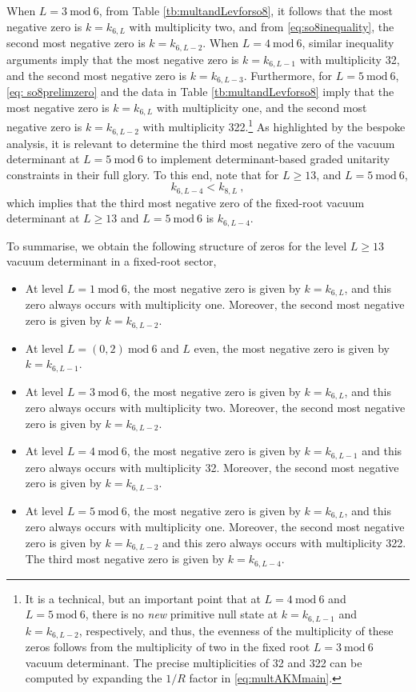 When $L = 3~\textrm{mod}~6$, from Table \ref{tb:multandLevforso8}, it follows that the most negative zero is $k = k_{6,L}$ with multiplicity two, and from \eqref{eq:so8inequality}, the second most negative zero is $k = k_{6,L-2}$. When $L = 4~\textrm{mod}~6$, similar inequality arguments imply that the most negative zero is $k = k_{6,L-1}$ with multiplicity 32, and the second most negative zero is $k = k_{6,L-3}$. Furthermore, for $L = 5~\textrm{mod}~6$, \eqref{eq: so8prelimzero} and the data in Table \ref{tb:multandLevforso8} imply that the most negative zero is $k = k_{6,L}$ with multiplicity one, and the second most negative zero is $k = k_{6,L-2}$ with multiplicity 322.\footnote{It is a technical, but an important point that at $L = 4~\textrm{mod}~6$ and $L = 5~\textrm{mod}~6$, there is no \emph{new} primitive null state at $k = k_{6,L-1}$ and $k = k_{6,L-2}$, respectively, and thus, the evenness of the multiplicity of these zeros follows from the multiplicity of two in the fixed root $L = 3~\textrm{mod}~6$ vacuum determinant. The precise multiplicities of 32 and 322 can be computed by expanding the $1/R$ factor in \eqref{eq:multAKMmain}.} As highlighted by the bespoke analysis, it is relevant to determine the third most negative zero of the vacuum determinant at $L=5~\text{mod}~6$ to implement determinant-based graded unitarity constraints in their full glory. To this end, note that for $L \geqslant 13$, and $L=5~\text{mod}~6$, 
\begin{equation}
    k_{6,L-4} < k_{8,L}~,
\end{equation}
which implies that the third most negative zero of the fixed-root vacuum determinant at $L \geqslant 13$ and $L=5~\text{mod}~6$ is $k_{6,L-4}$. 

To summarise, we obtain the following structure of zeros for the level $L \geqslant 13$ vacuum determinant in a fixed-root sector,
\begin{itemize}
    \item At level $L = 1~\text{mod}~6$, the most negative zero is given by $k=k_{6,L}$, and this zero always occurs with multiplicity one. Moreover, the second most negative zero is given by $k = k_{6,L-2}$. 
    \item At level $L = (0,2)~\text{mod}~6$ and $L$ even, the most negative zero is given by $k=k_{6,L-1}$.
    \item At level $L = 3~\text{mod}~6$, the most negative zero is given by $k = k_{6,L}$, and this zero always occurs with multiplicity two. Moreover, the second most negative zero is given by $k = k_{6,L-2}$. 
    \item At level $L = 4~\text{mod}~6$, the most negative zero is given by $k = k_{6,L-1}$ and this zero always occurs with multiplicity 32. Moreover, the second most negative zero is given by $k = k_{6,L-3}$. 
    \item At level $L = 5~\text{mod}~6$, the most negative zero is given by $k = k_{6,L}$, and this zero always occurs with multiplicity one. Moreover, the second most negative zero is given by $k = k_{6,L-2}$ and this zero always occurs with multiplicity 322. The third most negative zero is given by $k = k_{6,L-4}$.  
\end{itemize}

